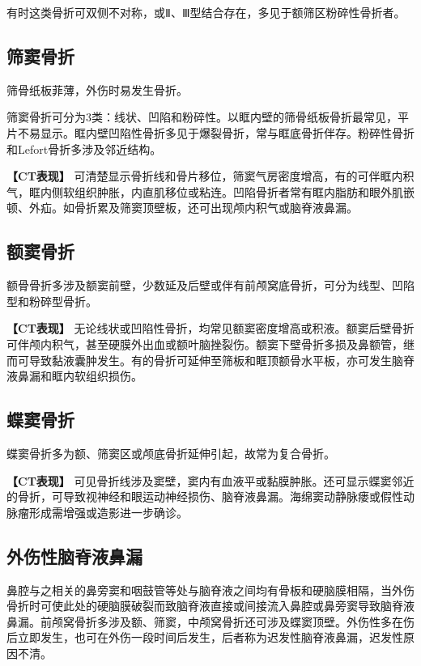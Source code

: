 有时这类骨折可双侧不对称，或Ⅱ、Ⅲ型结合存在，多见于额筛区粉碎性骨折者。

\subsection{筛窦骨折}

筛骨纸板菲薄，外伤时易发生骨折。

筛窦骨折可分为3类：线状、凹陷和粉碎性。以眶内壁的筛骨纸板骨折最常见，平片不易显示。眶内壁凹陷性骨折多见于爆裂骨折，常与眶底骨折伴存。粉碎性骨折和Lefort骨折多涉及邻近结构。

\textbf{【CT表现】}
可清楚显示骨折线和骨片移位，筛窦气房密度增高，有的可伴眶内积气，眶内侧软组织肿胀，内直肌移位或粘连。凹陷骨折者常有眶内脂肪和眼外肌嵌顿、外疝。如骨折累及筛窦顶壁板，还可出现颅内积气或脑脊液鼻漏。

\subsection{额窦骨折}

额骨骨折多涉及额窦前壁，少数延及后壁或伴有前颅窝底骨折，可分为线型、凹陷型和粉碎型骨折。

\textbf{【CT表现】}
无论线状或凹陷性骨折，均常见额窦密度增高或积液。额窦后壁骨折可伴颅内积气，甚至硬膜外出血或额叶脑挫裂伤。额窦下壁骨折多损及鼻额管，继而可导致黏液囊肿发生。有的骨折可延伸至筛板和眶顶额骨水平板，亦可发生脑脊液鼻漏和眶内软组织损伤。

\subsection{蝶窦骨折}

蝶窦骨折多为额、筛窦区或颅底骨折延伸引起，故常为复合骨折。

\textbf{【CT表现】}
可见骨折线涉及窦壁，窦内有血液平或黏膜肿胀。还可显示蝶窦邻近的骨折，可导致视神经和眼运动神经损伤、脑脊液鼻漏。海绵窦动静脉瘘或假性动脉瘤形成需增强或造影进一步确诊。

\subsection{外伤性脑脊液鼻漏}

鼻腔与之相关的鼻旁窦和咽鼓管等处与脑脊液之间均有骨板和硬脑膜相隔，当外伤骨折时可使此处的硬脑膜破裂而致脑脊液直接或间接流入鼻腔或鼻旁窦导致脑脊液鼻漏。前颅窝骨折多涉及额、筛窦，中颅窝骨折还可涉及蝶窦顶壁。外伤性多在伤后立即发生，也可在外伤一段时间后发生，后者称为迟发性脑脊液鼻漏，迟发性原因不清。

